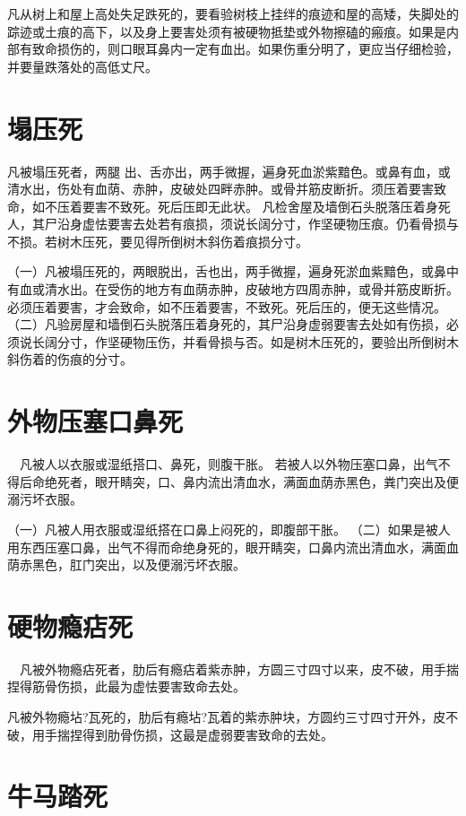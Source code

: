 \documentclass[12pt,UTF8]{ctexbook}
\begin{document}
凡从树上和屋上高处失足跌死的，要看验树枝上挂绊的痕迹和屋的高矮，失脚处的踪迹或土痕的高下，以及身上要害处须有被硬物抵垫或外物擦磕的瘢痕。如果是内部有致命损伤的，则口眼耳鼻内一定有血出。如果伤重分明了，更应当仔细检验，并要量跌落处的高低丈尺。


\chapter{塌压死}

凡被塌压死者，两腿 出、舌亦出，两手微握，遍身死血淤紫黯色。或鼻有血，或清水出，伤处有血荫、赤肿，皮破处四畔赤肿。或骨并筋皮断折。须压着要害致命，如不压着要害不致死。死后压即无此状。
凡检舍屋及墙倒石头脱落压着身死人，其尸沿身虚怯要害去处若有痕损，须说长阔分寸，作坚硬物压痕。仍看骨损与不损。若树木压死，要见得所倒树木斜伤着痕损分寸。



（一）凡被塌压死的，两眼脱出，舌也出，两手微握，遍身死淤血紫黯色，或鼻中有血或清水出。在受伤的地方有血荫赤肿，皮破地方四周赤肿，或骨并筋皮断折。必须压着要害，才会致命，如不压着要害，不致死。死后压的，便无这些情况。
（二）凡验房屋和墙倒石头脱落压着身死的，其尸沿身虚弱要害去处如有伤损，必须说长阔分寸，作坚硬物压伤，并看骨损与否。如是树木压死的，要验出所倒树木斜伤着的伤痕的分寸。


\chapter{外物压塞口鼻死}

　凡被人以衣服或湿纸搭口、鼻死，则腹干胀。
若被人以外物压塞口鼻，出气不得后命绝死者，眼开睛突，口、鼻内流出清血水，满面血荫赤黑色，粪门突出及便溺污坏衣服。



（一）凡被人用衣服或湿纸搭在口鼻上闷死的，即腹部干胀。
（二）如果是被人用东西压塞口鼻，出气不得而命绝身死的，眼开睛突，口鼻内流出清血水，满面血荫赤黑色，肛门突出，以及便溺污坏衣服。


\chapter{硬物瘾痁死}

　凡被外物瘾痁死者，肋后有瘾痁着紫赤肿，方圆三寸四寸以来，皮不破，用手揣捏得筋骨伤损，此最为虚怯要害致命去处。


凡被外物瘾坫?瓦死的，肋后有瘾坫?瓦着的紫赤肿块，方圆约三寸四寸开外，皮不破，用手揣捏得到肋骨伤损，这最是虚弱要害致命的去处。


\chapter{牛马踏死}
\end{document}

